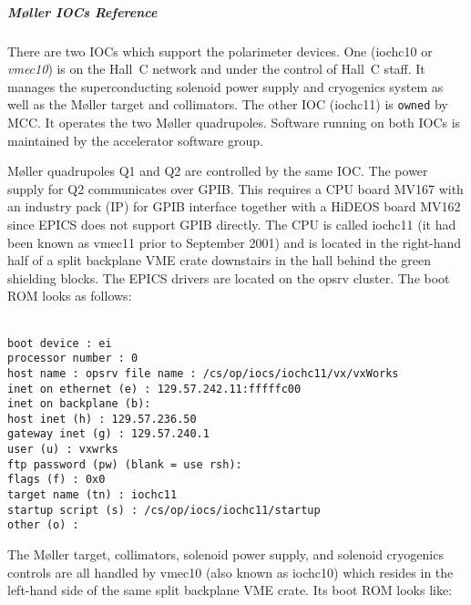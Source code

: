 {\subparagraph{M\o ller IOCs Reference}

There are two IOCs which support the polarimeter devices. One
(iochc10 or {\it vmec10}) is on the Hall~C network and under the
control of Hall~C staff. It manages the superconducting solenoid
power supply and cryogenics system as well as the M\o ller target and
collimators. The other IOC (iochc11) is {\tt owned} by MCC. It
operates the two M\o ller quadrupoles. Software running on both
IOCs is maintained by the accelerator software group.

M\o ller quadrupoles Q1 and Q2 are controlled by the same IOC.
The power supply for Q2 communicates over GPIB. This requires a 
CPU board MV167 with an industry pack (IP)
for GPIB interface together with a HiDEOS board MV162 since EPICS
does not support GPIB directly. The CPU is called iochc11 (it had
been known as vmec11 prior to September 2001) and
is located in the right-hand half of a split backplane VME crate 
downstairs in the hall behind the green
shielding blocks. The EPICS drivers are located on the opsrv cluster.
The boot ROM looks as follows:

\texttt{\\
boot device          : ei \\
processor number     : 0 \\
host name            : opsrv 
file name            : /cs/op/iocs/iochc11/vx/vxWorks \\
inet on ethernet (e) : 129.57.242.11:fffffc00 \\
inet on backplane (b): \\
host inet (h)        : 129.57.236.50 \\
gateway inet (g)     : 129.57.240.1 \\
user (u)             : vxwrks \\
ftp password (pw) (blank = use rsh): \\
flags (f)            : 0x0 \\
target name (tn)     : iochc11\\
startup script (s)   : /cs/op/iocs/iochc11/startup \\
other (o)            : \\
}

The M\o ller target, collimators, solenoid power supply, and
solenoid cryogenics controls are all handled by vmec10 (also
known as iochc10) which resides in the left-hand side of the
same split backplane VME crate. Its boot ROM looks like:



}
